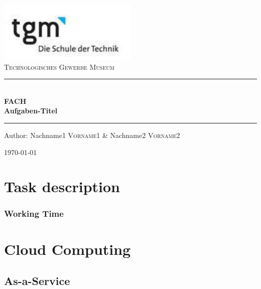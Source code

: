 \documentclass[12pt]{article}
\begin{document}
\begin{titlepage}
\begin{center}
\includegraphics[width=0.5\textwidth]{images/logo}\\[1cm]    

\textsc{\LARGE Technologisches Gewerbe Museum}\\[1.5cm]

\rule{12cm}{1mm}
{ \huge \bfseries  \\\large FACH\\ \huge Aufgaben-Titel \\[0.4cm] }

\rule{12cm}{1mm}

\noindent 
\vspace{5cm}

\begin{center}
\large
Author: 
Nachname1 \textsc{Vorname1} \&
Nachname2 \textsc{Vorname2}
\end{center}

\vfill

{\large \today}

\end{center}
\end{titlepage}

\tableofcontents


\ohead{\headmark}

\section{Task description}
\subsubsection{Working Time}
\section{Cloud Computing}
\subsection{As-a-Service}
\end{document}
